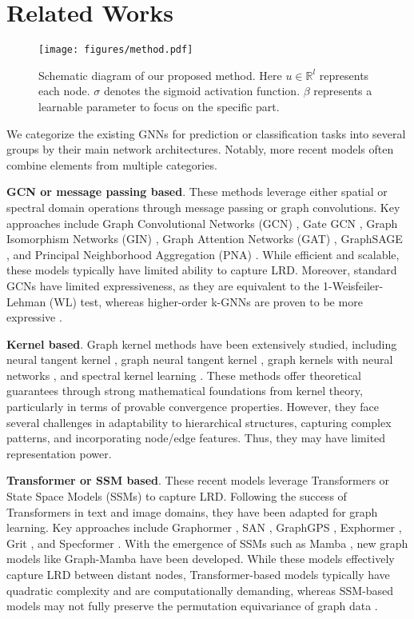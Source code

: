 \section{Related Works}
\begin{figure*}[h]
    \centering
    \texttt{[image: figures/method.pdf]}
    \caption{Schematic diagram of our proposed method. Here $u\in\mathbb{R}^{l}$ represents each node. $\sigma$ denotes the sigmoid activation function. $\beta$ represents a learnable parameter to focus on the specific part.}
    \label{fig:method}
\end{figure*}
We categorize the existing GNNs for prediction or classification tasks into several groups by their main network architectures. Notably, more recent models often combine elements from multiple categories.

{\bf{GCN or message passing based}}. These methods leverage either spatial or spectral domain operations through message passing or graph convolutions. Key approaches include Graph Convolutional Networks (GCN) \cite{kipf2016semi}, Gate GCN \cite{bresson2017residual}, Graph Isomorphism Networks (GIN) \cite{xu2018powerful}, Graph Attention Networks (GAT) \cite{velivckovic2018graph}, GraphSAGE \cite{hamilton2017inductive}, and Principal Neighborhood Aggregation (PNA) \cite{corso2020principal}. While efficient and scalable, these models typically have limited ability to capture LRD. Moreover, standard GCNs have limited expressiveness, as they are equivalent to the 1-Weisfeiler-Lehman (WL) test, whereas higher-order k-GNNs are proven to be more expressive \cite{morris2019weisfeiler}.

{\bf{Kernel based}}. Graph kernel methods have been extensively studied, including neural tangent kernel \cite{jacot2018neural}, graph neural tangent kernel \cite{du2019graph},
graph kernels with neural networks \cite{morris2019weisfeiler}, and spectral kernel learning \cite{zhi2023gaussian}. These methods offer theoretical guarantees through strong mathematical foundations from kernel theory, particularly in terms of provable convergence properties.
However, they face several challenges in adaptability to hierarchical structures, capturing complex patterns, and incorporating node/edge features. Thus, they may have limited representation power. 

{\bf{Transformer or SSM based}}. These recent models leverage Transformers or State Space Models (SSMs) to capture LRD. Following the success of Transformers in text and image domains, they have been adapted for graph learning. Key approaches include Graphormer \cite{ying2021transformers}, SAN \cite{kreuzer2021rethinking}, GraphGPS \cite{rampavsek2022recipe}, Exphormer \cite{shirzad2023exphormer}, Grit \cite{ma2023graph}, and Specformer \cite{bo2022specformer}. With the emergence of SSMs such as Mamba \cite{gu2023mamba}, new graph models like Graph-Mamba \cite{wang2024state} have been developed. While these models effectively capture LRD between distant nodes, Transformer-based models typically have quadratic complexity and are computationally demanding, whereas SSM-based models may not fully preserve the permutation equivariance of graph data \cite{zhang2024expressive}.

